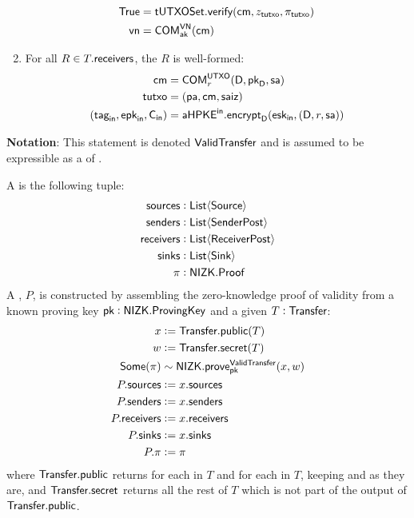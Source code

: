 \begin{definition}
\begin{enumerate}
\begin{align*}
                {\textsf{True}}                                 &=  {\textsf{tUTXOSet}}.{\textsf{verify}}({\textsf{cm}}, z_{\textsf{tutxo}}, \pi_{\textsf{tutxo}})\\
                {\textsf{vn}}                                   &= {\textsf{COM}}^{{\textsf{VN}}}_{{\textsf{ak}}}({\textsf{cm}})
            \end{align*}
        \item For all $R \in T.{\textsf{receivers}}$, the \Receiver{} $R$ is well-formed:
            \begin{align*}
                {\textsf{cm}}            &= {\textsf{COM}}^{{\textsf{UTXO}}}_{r}(\textsf{D}, {{\textsf{pk}}_\textsf{D}}, {\textsf{sa}}) \\
                {\textsf{tutxo}}         &= ({\textsf{pa}}, {\textsf{cm}}, {\textsf{saiz}}) \\
                ({{\textsf{tag}}_\textsf{in}}, {{\textsf{epk}}_\textsf{in}}, {\textsf{C}_\textsf{in}}) &= {{\textsf{aHPKE}}^\textsf{in}}.{\textsf{encrypt}}_\textsf{D}({{\textsf{esk}}_\textsf{in}}, (\textsf{D}, r, {\textsf{sa}}))
            \end{align*}
    \end{enumerate}
    \textbf{Notation}: This statement is denoted ${\textsf{ValidTransfer}}$ and is assumed to be expressible as a \Statement{} of \NIZK{}.
\end{definition}

\begin{definition}
    A \TransferPost{} is the following tuple:
    \begin{align*}
        {\textsf{sources}}    &: {\textsf{List}}\langle{{\textsf{Source}}}\rangle \\
        {\textsf{senders}}    &: {\textsf{List}}\langle{{\textsf{SenderPost}}}\rangle \\
        {\textsf{receivers}}  &: {\textsf{List}}\langle{{\textsf{ReceiverPost}}}\rangle \\
        {\textsf{sinks}}      &: {\textsf{List}}\langle{{\textsf{Sink}}}\rangle \\
        \pi         &: {\textsf{NIZK}}.{\textsf{Proof}} 
    \end{align*}
    A \TransferPost{}, $P$, is constructed by assembling the zero-knowledge proof of \Transfer{} validity from a known proving key ${\textsf{pk}} : {\textsf{NIZK}}.{\textsf{ProvingKey}}$ and a given $T : {\textsf{Transfer}}$:
    \begin{align*}
        x             &:= {\textsf{Transfer}}.{\textsf{public}}(T) \\
        w             &:= {\textsf{Transfer}}.{\textsf{secret}}(T) \\
        {\textsf{Some}}(\pi)    &\sim {\textsf{NIZK}}.{\textsf{prove}}^{\textsf{ValidTransfer}}_{{\textsf{pk}}}(x, w) \\
        P.{\textsf{sources}}    &:= x.{\textsf{sources}} \\
        P.{\textsf{senders}}    &:= x.{\textsf{senders}} \\
        P.{\textsf{receivers}}  &:= x.{\textsf{receivers}} \\
        P.{\textsf{sinks}}      &:= x.{\textsf{sinks}} \\
        P.\pi         &:= \pi
    \end{align*}
    where ${\textsf{Transfer}}.{\textsf{public}}$ returns  for each \Sender{} in $T$ and  for each \Receiver{} in $T$, keeping  and  as they are, and ${\textsf{Transfer}}.{\textsf{secret}}$ returns all the rest of $T$ which is not part of the output of ${\textsf{Transfer}}.{\textsf{public}}$.
\end{definition}

